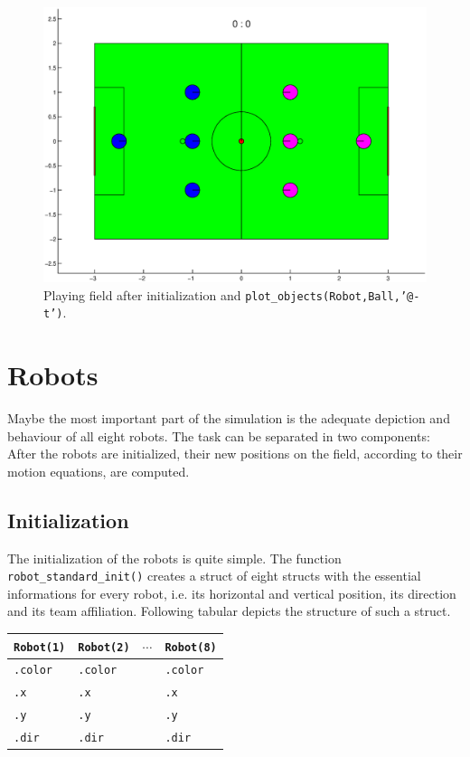 \begin{figure}[h]
	\centering
    	\includegraphics[width=12cm]{./2_Simulation/playing_field_robots}
  	\caption{Playing field after initialization and \texttt{plot\_objects(Robot,Ball,'@-t')}.}
  	\label{Playing_field_robots}
\end{figure}


\section{Robots} \label{Robotsection}

Maybe the most important part of the simulation is the adequate depiction and behaviour of all eight robots. The task can be separated in two components: After the robots are initialized, their new positions on the field, according to their motion equations, are computed.

\subsection*{Initialization}
The initialization of the robots is quite simple. The function \texttt{ robot\_standard\_init()} creates a struct of eight structs with the essential informations for every robot, i.e. its horizontal and vertical position, its direction and its team affiliation. Following tabular depicts the structure of such a struct.

\begin{center}
	\begin{tabular}{| l | l | c | l |} \hline
		\texttt{Robot(1)} & \texttt{Robot(2)} & $\cdots$ & \texttt{Robot(8)}  \\ \hline
		\texttt{.color} & \texttt{.color} & &\texttt{.color} \\
		\texttt{.x} & \texttt{.x} & & \texttt{.x} \\
		\texttt{.y} & \texttt{.y} & & \texttt{.y} \\
		\texttt{.dir} & \texttt{.dir} & & \texttt{.dir}\\ \hline
	\end{tabular}
\end{center}
 
